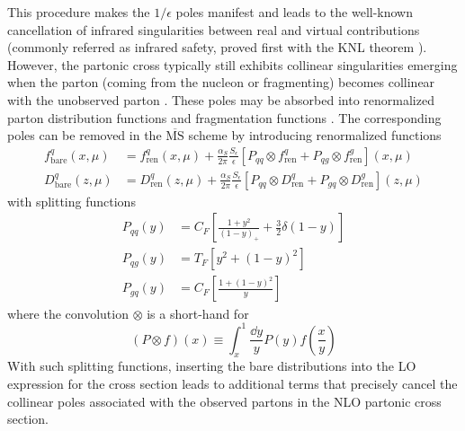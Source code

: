 This procedure makes the $1/\epsilon$ poles manifest and leads to the well-known cancellation of infrared singularities between real and virtual contributions (commonly referred as infrared safety, proved first with the KNL theorem \cite{kinoshita_mass_1962,LeeNauenberg64}). However, the partonic cross typically still exhibits collinear singularities emerging when the parton (coming from the nucleon or fragmenting) becomes collinear with the unobserved parton \cite{hinderer_single-inclusive_2015}. These poles may be absorbed into renormalized parton distribution functions and fragmentation functions \cite{altarelli_large_1979, Collins_2011}. The corresponding poles can be removed in the $\overline{\text{MS}}$ scheme by introducing renormalized functions
\begin{equation}
\begin{aligned}
    f^q_{\text{bare}}(x,\mu)&= f^q_{\text{ren}}(x,\mu)+\frac{\alpha_S}{2\pi}\frac{S_\epsilon}{\epsilon}\left[P_{qq} \otimes f^q_{\text{ren}}+P_{qg} \otimes f^g_{\text{ren}}\right](x,\mu)\\
    D^q_{\text{bare}}(z,\mu)&= D^q_{\text{ren}}(z,\mu)+\frac{\alpha_S}{2\pi}\frac{S_\epsilon}{\epsilon}\left[P_{qq} \otimes D^q_{\text{ren}}+P_{gq} \otimes D^g_{\text{ren}}\right](z,\mu)
\end{aligned}
\end{equation}
with splitting functions
\begin{equation}
    \begin{aligned}
        P_{qq}(y)&=C_F\left[\frac{1+y^2}{(1-y)_+}+\frac{3}{2}\delta(1-y)\right]\\
        P_{qg}(y)&=T_F\left[y^2+(1-y)^2\right]\\
        P_{gq}(y)&=C_F\left[\frac{1+(1-y)^2}{y}\right]
    \end{aligned}
\end{equation}
where the convolution $\otimes$ is a short-hand for
\begin{equation}
    (P\otimes f )(x)\equiv\int_x^1\frac{\dd y}{y} P(y) f\left(\frac{x}{y}\right)
\end{equation}
With such splitting functions, inserting the bare distributions into the LO expression for the cross section leads to additional terms that precisely cancel the collinear poles associated with the observed partons in the NLO partonic cross section. 
